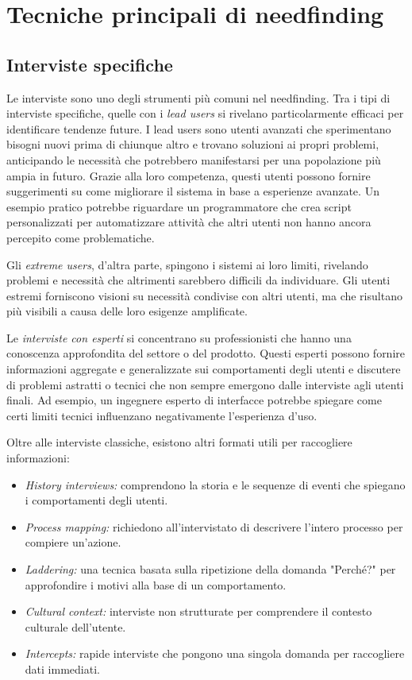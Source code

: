 \section{Tecniche principali di needfinding}
\subsection{Interviste specifiche}
Le interviste sono uno degli strumenti più comuni nel needfinding. Tra i tipi di interviste specifiche, quelle con i \textit{lead users} si rivelano particolarmente efficaci per identificare tendenze future. I lead users sono utenti avanzati che sperimentano bisogni nuovi prima di chiunque altro e trovano soluzioni ai propri problemi, anticipando le necessità che potrebbero manifestarsi per una popolazione più ampia in futuro. Grazie alla loro competenza, questi utenti possono fornire suggerimenti su come migliorare il sistema in base a esperienze avanzate. Un esempio pratico potrebbe riguardare un programmatore che crea script personalizzati per automatizzare attività che altri utenti non hanno ancora percepito come problematiche.

Gli \textit{extreme users}, d'altra parte, spingono i sistemi ai loro limiti, rivelando problemi e necessità che altrimenti sarebbero difficili da individuare. Gli utenti estremi forniscono visioni su necessità condivise con altri utenti, ma che risultano più visibili a causa delle loro esigenze amplificate.

Le \textit{interviste con esperti} si concentrano su professionisti che hanno una conoscenza approfondita del settore o del prodotto. Questi esperti possono fornire informazioni aggregate e generalizzate sui comportamenti degli utenti e discutere di problemi astratti o tecnici che non sempre emergono dalle interviste agli utenti finali. Ad esempio, un ingegnere esperto di interfacce potrebbe spiegare come certi limiti tecnici influenzano negativamente l'esperienza d'uso.

Oltre alle interviste classiche, esistono altri formati utili per raccogliere informazioni:
\begin{itemize}
    \item \textit{History interviews:} comprendono la storia e le sequenze di eventi che spiegano i comportamenti degli utenti.
    \item \textit{Process mapping:} richiedono all'intervistato di descrivere l'intero processo per compiere un'azione.
    \item \textit{Laddering:} una tecnica basata sulla ripetizione della domanda "Perché?" per approfondire i motivi alla base di un comportamento.
    \item \textit{Cultural context:} interviste non strutturate per comprendere il contesto culturale dell'utente.
    \item \textit{Intercepts:} rapide interviste che pongono una singola domanda per raccogliere dati immediati.
\end{itemize}

